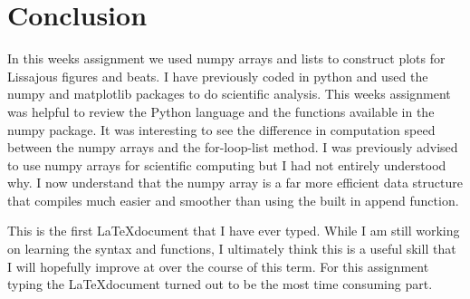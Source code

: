 \documentclass{article}
\begin{document}
 
 
 \section{Conclusion}
 In this weeks assignment we used numpy arrays and lists to construct plots for Lissajous figures and beats. I have previously coded in python and used the numpy and matplotlib packages to do scientific analysis. This weeks assignment was helpful to review the Python language and the functions available in the numpy package. It was interesting to see the difference in computation speed between the numpy arrays and the for-loop-list method. I was previously advised to use numpy arrays for scientific computing but I had not entirely understood why. I now understand that the numpy array is a far more efficient data structure that compiles much easier and smoother than using the built in append function. 
 
This is the first \LaTeX  document that I have ever typed. While I am still working on learning the syntax and functions, I ultimately think this is a useful skill that I will hopefully improve at over the course of this term. For this assignment typing the \LaTeX  document turned out to be the most time consuming part. 
\end{document}
